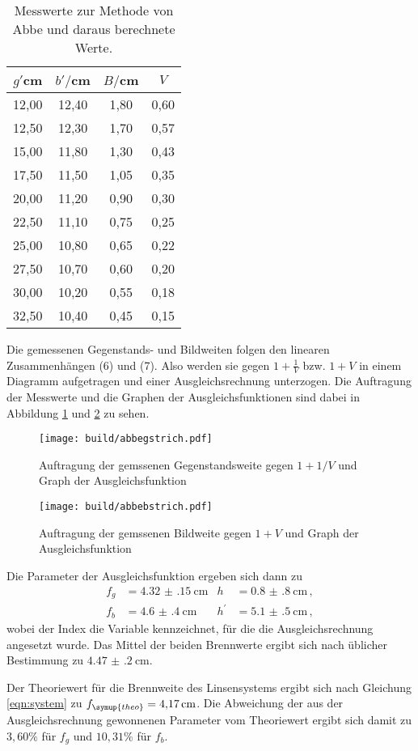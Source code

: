 \begin{table}[htp]
	\begin{center}
    \caption{Messwerte zur Methode von Abbe und daraus berechnete Werte.}
    \label{tab:abbe}
		\begin{tabular}{cccc}
		\toprule
			{$g'$cm} & {$b'/$cm} & {$B/$cm} & {$V$}\\
			\midrule
			12,00 & 12,40 & 1,80 & 0,60\\
			12,50 & 12,30 & 1,70 & 0,57\\
			15,00 & 11,80 & 1,30 & 0,43\\
			17,50 & 11,50 & 1,05 & 0,35\\
			20,00 & 11,20 & 0,90 & 0,30\\
			22,50 & 11,10 & 0,75 & 0,25\\
			25,00 & 10,80 & 0,65 & 0,22\\
			27,50 & 10,70 & 0,60 & 0,20\\
			30,00 & 10,20 & 0,55 & 0,18\\
			32,50 & 10,40 & 0,45 & 0,15\\
		\bottomrule
		\end{tabular}
	\end{center}
\end{table}

Die gemessenen Gegenstands- und Bildweiten folgen den linearen Zusammenhängen
(6) und (7). Also werden sie gegen $1+\frac{1}{V}$ bzw. $1+V$ in einem Diagramm
aufgetragen und einer Ausgleichsrechnung unterzogen. Die Auftragung der Messwerte
und die Graphen der Ausgleichsfunktionen sind dabei in Abbildung \ref{fig:gstrich}
und \ref{fig:bstrich} zu sehen.

\begin{figure}%
  \centering
  \texttt{[image: build/abbegstrich.pdf]}
  \caption{Auftragung der gemssenen Gegenstandsweite gegen $1+1/V$ und Graph der Ausgleichsfunktion}
  \label{fig:gstrich}
\end{figure}

\begin{figure}%
  \centering
  \texttt{[image: build/abbebstrich.pdf]}
  \caption{Auftragung der gemssenen Bildweite gegen $1+V$ und Graph der Ausgleichsfunktion}
  \label{fig:bstrich}
\end{figure}

Die Parameter der Ausgleichsfunktion ergeben sich dann zu
\begin{align*}
	f_g &= \SI{4.32(15)}{\centi\meter}		&		h &= \SI{0.8(8)}{\centi\meter} \,, \\
	f_b &= \SI{4.6(4)}{\centi\meter}		&		h^\prime &= \SI{5.1(5)}{\centi\meter}\,,
\end{align*}
wobei der Index die Variable kennzeichnet, für die die Ausgleichsrechnung
angesetzt wurde. Das Mittel der beiden Brennwerte ergibt sich nach üblicher
Bestimmung zu $\SI{4.47(20)}{\centi\meter}$.

Der Theoriewert für die Brennweite des Linsensystems ergibt sich nach Gleichung
\eqref{eqn:system} zu $f_{\symup{theo}}=\SI{4.17}{\centi\meter}$. Die Abweichung
der aus der Ausgleichsrechnung gewonnenen Parameter vom Theoriewert ergibt sich
damit zu $3,60 \%$ für $f_g$ und $10,31 \%$ für $f_b$.
